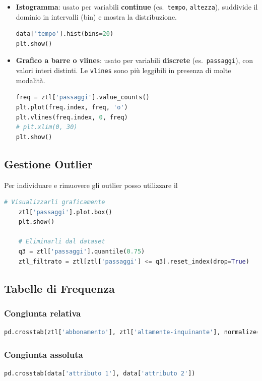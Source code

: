 \documentclass{article}
\begin{document}
\begin{itemize}
  \item \textbf{Istogramma}: usato per variabili \textbf{continue} (es.\ \texttt{tempo}, \texttt{altezza}), suddivide il dominio in intervalli (bin) e mostra la distribuzione.
  \begin{lstlisting}[language=Python]
data['tempo'].hist(bins=20)
plt.show()
  \end{lstlisting}

  \item \textbf{Grafico a barre o vlines}: usato per variabili \textbf{discrete} (es.\ \texttt{passaggi}), con valori interi distinti. Le \texttt{vlines} sono più leggibili in presenza di molte modalità.
  \begin{lstlisting}[language=Python]
freq = ztl['passaggi'].value_counts()
plt.plot(freq.index, freq, 'o')
plt.vlines(freq.index, 0, freq)
# plt.xlim(0, 30)
plt.show()
  \end{lstlisting}
\end{itemize}


\subsection*{Gestione Outlier}

Per individuare e rimuovere gli outlier posso utilizzare il 

\begin{lstlisting}[language=Python]
    # Visualizzarli graficamente
    ztl['passaggi'].plot.box()
    plt.show()

    # Eliminarli dal dataset
    q3 = ztl['passaggi'].quantile(0.75)
    ztl_filtrato = ztl[ztl['passaggi'] <= q3].reset_index(drop=True)
\end{lstlisting}

\subsection*{Tabelle di Frequenza}

\subsubsection*{Congiunta relativa}
\begin{lstlisting}[language=Python]
pd.crosstab(ztl['abbonamento'], ztl['altamente-inquinante'], normalize=True)
\end{lstlisting}

\subsubsection*{Congiunta assoluta}
\begin{lstlisting}[language=Python]
    pd.crosstab(data['attributo 1'], data['attributo 2'])
\end{lstlisting}
\end{document}
